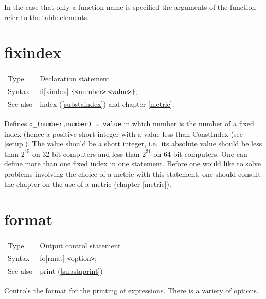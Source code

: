 \noindent In the case that only a function name is specified the arguments 
of the function refer to the table elements.
\vspace{10mm}

 
\section{fixindex}
\label{substafixindex}

\noindent \begin{tabular}{ll}
Type & Declaration statement\\
Syntax & fi[xindex] \verb:{:{\tt<}number{\tt>}:{\tt<}value{\tt>}\verb:}:;
\\ See also & index (\ref{substaindex}) and chapter \ref{metric}.
\end{tabular} \vspace{4mm}

\noindent Defines \verb:d_(number,number) = value: in which number is the 
number of a fixed index 
(hence a positive short integer with a value less than 
ConstIndex (see \ref{setup}). The value should be a 
short integer, i.e.\ its absolute value should be less 
than $2^{15}$ on 32 bit computers and less than $2^{31}$ on 
64 bit 
computers. One can define more than one fixed index in one statement. 
Before one would like to solve problems involving the choice of a metric 
with this statement, one should consult the chapter on the use of a 
metric 
(chapter \ref{metric}).
\vspace{10mm}


\section{format}
\label{substaformat}

\noindent \begin{tabular}{ll}
Type & Output control statement\\
Syntax & fo[rmat] {\tt<}option{\tt>};
\\ See also & print (\ref{substaprint})
\end{tabular} \vspace{4mm}

\noindent Controls the format for the 
printing of expressions. There is a variety of options.

